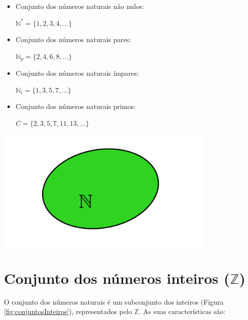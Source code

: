 \documentclass[10pt]{article}
\begin{document}
\begin{multicols}{2}
    \begin{itemize}
        \item Conjunto dos números naturais não nulos:
        
            \( \mathbb{N}^* = \{1, 2, 3, 4, \ldots \} \)
        \item Conjunto dos números naturais pares:
            
            \( \mathbb{N}_p = \{2, 4, 6, 8, \ldots \} \)
        \item Conjunto dos números naturais ímpares:
        
            \( \mathbb{N}_i = \{1, 3, 5, 7, \ldots \} \)
        \item Conjunto dos números naturais primos:
        
            \( C = \{2, 3, 5, 7, 11, 13, \ldots \} \)
        
    \end{itemize}
\columnbreak
\bigskip
\noindent
    \begin{minipage}{\linewidth}
        \centering 
        \includegraphics[width=0.8\textwidth]{imgs/conjuntosNumerico/conjuntosNaturais.pdf}
        \label{fig:conjuntosNaturais} 
    \end{minipage}%
\end{multicols} 



\section*{Conjunto dos números inteiros (\( \mathbb{Z} \))}
O conjunto dos números naturais é um subconjunto dos inteiros (Figura \ref{fig:conjuntosInteiros}), representados pelo \( \mathbb{Z}\). As suas características são:
\end{document}
